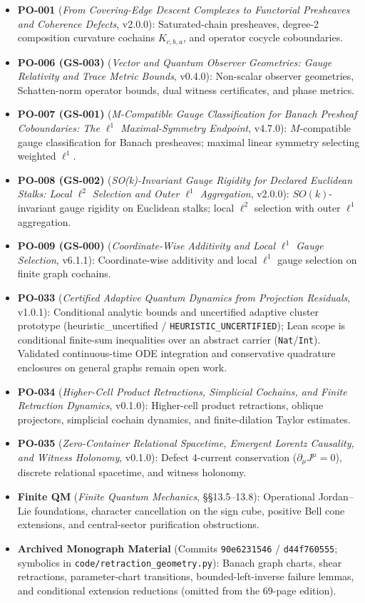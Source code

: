 \documentclass[
  11pt,
]{article}
\providecommand{\tightlist}{%
  \setlength{\itemsep}{0pt}\setlength{\parskip}{0pt}}
\providecommand{\tightlist}{%
  \setlength{\itemsep}{0pt}\setlength{\parskip}{0pt}}
\begin{document}
\begin{itemize}
\tightlist
\item
  \textbf{PO-001} (\emph{From Covering-Edge Descent Complexes to Functorial Presheaves and Coherence Defects}, v2.0.0): Saturated-chain presheaves, degree-2 composition curvature cochains \(K_{c,b,a}\), and operator cocycle coboundaries.
\item
  \textbf{PO-006 (GS-003)} (\emph{Vector and Quantum Observer Geometries: Gauge Relativity and Trace Metric Bounds}, v0.4.0): Non-scalar observer geometries, Schatten-norm operator bounds, dual witness certificates, and phase metrics.
\item
  \textbf{PO-007 (GS-001)} (\emph{M-Compatible Gauge Classification for Banach Presheaf Coboundaries: The \(\ell^1\) Maximal-Symmetry Endpoint}, v4.7.0): \(M\)-compatible gauge classification for Banach presheaves; maximal linear symmetry selecting weighted \(\ell^1\).
\item
  \textbf{PO-008 (GS-002)} (\emph{SO(k)-Invariant Gauge Rigidity for Declared Euclidean Stalks: Local \(\ell^2\) Selection and Outer \(\ell^1\) Aggregation}, v2.0.0): \(SO(k)\)-invariant gauge rigidity on Euclidean stalks; local \(\ell^2\) selection with outer \(\ell^1\) aggregation.
\item
  \textbf{PO-009 (GS-000)} (\emph{Coordinate-Wise Additivity and Local \(\ell^1\) Gauge Selection}, v6.1.1): Coordinate-wise additivity and local \(\ell^1\) gauge selection on finite graph cochains.
\item
  \textbf{PO-033} (\emph{Certified Adaptive Quantum Dynamics from Projection Residuals}, v1.0.1): Conditional analytic bounds and uncertified adaptive cluster prototype (heuristic\_uncertified / \texttt{HEURISTIC\_UNCERTIFIED}); Lean scope is conditional finite-sum inequalities over an abstract carrier (\texttt{Nat}/\texttt{Int}). Validated continuous-time ODE integration and conservative quadrature enclosures on general graphs remain open work.
\item
  \textbf{PO-034} (\emph{Higher-Cell Product Retractions, Simplicial Cochains, and Finite Retraction Dynamics}, v0.1.0): Higher-cell product retractions, oblique projectors, simplicial cochain dynamics, and finite-dilation Taylor estimates.
\item
  \textbf{PO-035} (\emph{Zero-Container Relational Spacetime, Emergent Lorentz Causality, and Witness Holonomy}, v0.1.0): Defect 4-current conservation (\(\partial_\mu J^\mu=0\)), discrete relational spacetime, and witness holonomy.
\item
  \textbf{Finite QM} (\emph{Finite Quantum Mechanics}, §§13.5--13.8): Operational Jordan--Lie foundations, character cancellation on the sign cube, positive Bell cone extensions, and central-sector purification obstructions.
\item
  \textbf{Archived Monograph Material} (Commits \texttt{90e6231546} / \texttt{d44f760555}; symbolics in \texttt{code/retraction\_geometry.py}): Banach graph charts, shear retractions, parameter-chart transitions, bounded-left-inverse failure lemmas, and conditional extension reductions (omitted from the 69-page edition).
\end{itemize}
\end{document}
